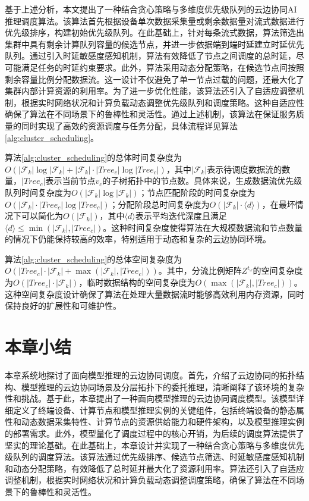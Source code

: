基于上述分析，本文提出了一种结合贪心策略与多维度优先级队列的云边协同AI推理调度算法。该算法首先根据设备单次数据采集量或剩余数据量对流式数据进行优先级排序，构建初始优先级队列。在此基础上，针对每条流式数据，算法筛选出集群中具有剩余计算队列容量的候选节点，并进一步依据端到端时延建立时延优先队列。通过引入时延敏感度感知机制，算法有效降低了节点之间调度的总时延，尽可能满足任务的时延约束要求。此外，算法采用动态分配策略，在候选节点间按照剩余容量比例分配数据流。这一设计不仅避免了单一节点过载的问题，还最大化了集群内部计算资源的利用率。为了进一步优化性能，该算法还引入了自适应调整机制，根据实时网络状况和计算负载动态调整优先级队列和调度策略。这种自适应性确保了算法在不同场景下的鲁棒性和灵活性。通过上述机制，该算法在保证服务质量的同时实现了高效的资源调度与任务分配，具体流程详见算法\ref{alg:cluster_scheduling}。

算法\ref{alg:cluster_scheduling}的总体时间复杂度为$O(|\mathcal{F}_k| \log |\mathcal{F}_k| + |\mathcal{F}_k| \cdot |Tree_c| \log |Tree_c|)$，其中$|\mathcal{F}_k|$表示待调度数据流的数量，$|Tree_c|$表示当前节点$v_c$的子树拓扑中的节点数。具体来说，生成数据流优先级队列时间复杂度为$O(|\mathcal{F}_k| \log |\mathcal{F}_k|)$；节点匹配阶段的时间复杂度为$O(|\mathcal{F}_k| \cdot |Tree_c| \log |Tree_c|)$；分配阶段总时间复杂度为$O(|\mathcal{F}_k| \cdot \langle d \rangle)$，在最坏情况下可以简化为$O(|\mathcal{F}_k|)$，其中$\langle d \rangle$表示平均迭代深度且满足$\langle d \rangle \leq \min(|\mathcal{F}_k|, |Tree_c|)$。这种时间复杂度使得算法在大规模数据流和节点数量的情况下仍能保持较高的效率，特别适用于动态和复杂的云边协同环境。

算法\ref{alg:cluster_scheduling}的总体空间复杂度为$O(|Tree_c| \cdot |\mathcal{F}_k| + \max(|\mathcal{F}_k|, |Tree_c|))$。其中，分流比例矩阵$Z^{t_\omega}$的空间复杂度为$O(|Tree_c| \cdot |\mathcal{F}_k|)$，临时数据结构的空间复杂度为$O(\max(|\mathcal{F}_k|, |Tree_c|))$。这种空间复杂度设计确保了算法在处理大量数据流时能够高效利用内存资源，同时保持良好的扩展性和可维护性。

\section{本章小结}

本章系统地探讨了面向模型推理的云边协同调度。首先，介绍了云边协同的拓扑结构、模型推理的云边协同场景及分层拓扑下的委托推理，清晰阐释了该环境的复杂性和挑战。基于此，本章提出了一种面向模型推理的云边协同调度模型。该模型详细定义了终端设备、计算节点和模型推理实例的关键组件，包括终端设备的静态属性和动态数据采集特性、计算节点的资源供给能力和硬件架构，以及模型推理实例的部署需求。此外，模型量化了调度过程中的核心开销，为后续的调度算法提供了坚实的理论基础。在此基础上，本章设计并实现了一种结合贪心策略与多维度优先级队列的调度算法。该算法通过优先级排序、候选节点筛选、时延敏感度感知机制和动态分配策略，有效降低了总时延并最大化了资源利用率。算法还引入了自适应调整机制，根据实时网络状况和计算负载动态调整调度策略，确保了算法在不同场景下的鲁棒性和灵活性。
